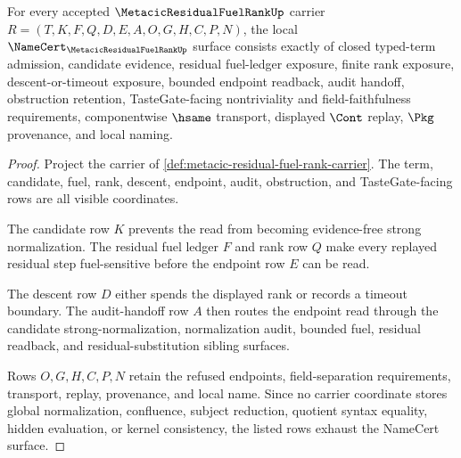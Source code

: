 \begin{theorem}
\label{thm:metacic-residual-fuel-rank-namecert-obligations}
For every accepted $\MetacicResidualFuelRankUp$ carrier $R=(T,K,F,Q,D,E,A,O,G,H,C,P,N)$, the local $\NameCert_{\MetacicResidualFuelRankUp}$ surface consists exactly of closed typed-term admission, candidate evidence, residual fuel-ledger exposure, finite rank exposure, descent-or-timeout exposure, bounded endpoint readback, audit handoff, obstruction retention, TasteGate-facing nontriviality and field-faithfulness requirements, componentwise $\hsame$ transport, displayed $\Cont$ replay, $\Pkg$ provenance, and local naming.
\end{theorem}
\begin{proof}
Project the carrier of \autoref{def:metacic-residual-fuel-rank-carrier}. The term, candidate, fuel, rank, descent, endpoint, audit, obstruction, and TasteGate-facing rows are all visible coordinates.

The candidate row $K$ prevents the read from becoming evidence-free strong normalization. The residual fuel ledger $F$ and rank row $Q$ make every replayed residual step fuel-sensitive before the endpoint row $E$ can be read.

The descent row $D$ either spends the displayed rank or records a timeout boundary. The audit-handoff row $A$ then routes the endpoint read through the candidate strong-normalization, normalization audit, bounded fuel, residual readback, and residual-substitution sibling surfaces.

Rows $O,G,H,C,P,N$ retain the refused endpoints, field-separation requirements, transport, replay, provenance, and local name. Since no carrier coordinate stores global normalization, confluence, subject reduction, quotient syntax equality, hidden evaluation, or kernel consistency, the listed rows exhaust the NameCert surface.
\end{proof}

